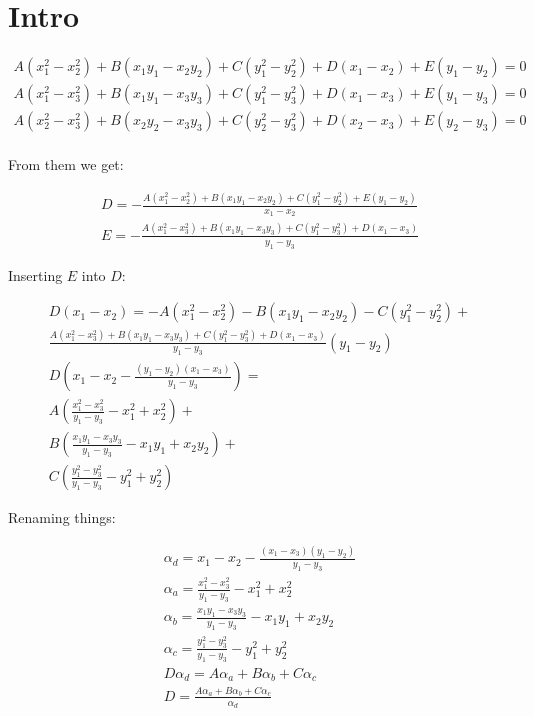 \documentclass{article}
\begin{document}
	\section{Intro}
	
	\begin{align*}
	A(x_1^2-x_2^2) + B(x_1y_1-x_2y_2) + C(y_1^2-y_2^2) + D(x_1-x_2)+E(y_1-y_2) = 0\\
	A(x_1^2-x_3^2) + B(x_1y_1-x_3y_3) + C(y_1^2-y_3^2) + D(x_1-x_3)+E(y_1-y_3) = 0\\
	A(x_2^2-x_3^2) + B(x_2y_2-x_3y_3) + C(y_2^2-y_3^2) + D(x_2-x_3)+E(y_2-y_3) = 0\\
	\end{align*}
	
	From them we get:
	
	\begin{align*}
	D = -\frac{A(x_1^2-x_2^2) + B(x_1y_1-x_2y_2) + C(y_1^2-y_2^2) + E(y_1-y_2)}{x_1-x_2}\\
	E = -\frac{	A(x_1^2-x_3^2) + B(x_1y_1-x_3y_3) + C(y_1^2-y_3^2) + D(x_1-x_3)}{y_1-y_3}
	\end{align*}
	
	Inserting $E$ into $D$:
	
	\begin{align*}
	D(x_1-x_2) = -A(x_1^2-x_2^2) - B(x_1y_1-x_2y_2) - C(y_1^2-y_2^2) +\\
	\frac{	A(x_1^2-x_3^2) + B(x_1y_1-x_3y_3) + C(y_1^2-y_3^2) + D(x_1-x_3)}{y_1-y_3}(y_1-y_2)\\
	D(x_1-x_2 - \frac{(y_1-y_2)(x_1-x_3)}{y_1-y_3})=\\
	A(\frac{x_1^2-x_3^2}{y_1-y_3}-x_1^2+x_2^2)+\\
	B(\frac{x_1y_1-x_3y_3}{y_1-y_3} - x_1y_1 + x_2y_2)+\\
	C(\frac{y_1^2-y_3^2}{y_1-y_3}-y_1^2+y_2^2)
	\end{align*}
	
	Renaming things:
	
	\begin{align*}
	\alpha_d = x_1-x_2 -\frac{(x_1-x_3)(y_1-y_2)}{y_1-y_3}\\
	\alpha_a = \frac{x_1^2-x_3^2}{y_1-y_3}-x_1^2+x_2^2\\
	\alpha_b = \frac{x_1y_1-x_3y_3}{y_1-y_3} - x_1y_1 + x_2y_2\\
	\alpha_c = \frac{y_1^2-y_3^2}{y_1-y_3}-y_1^2+y_2^2\\
	D\alpha_d = A\alpha_a + B\alpha_b + C\alpha_c\\
	D=\frac{A\alpha_a + B\alpha_b + C\alpha_c}{\alpha_d}
	\end{align*}
	
\end{document}
